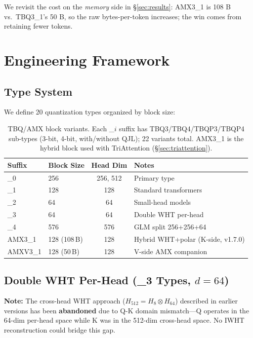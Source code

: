 \documentclass[10pt,twocolumn]{article}
\begin{document}
We revisit the cost on the \emph{memory} side in \S\ref{sec:results}: AMX3\_1 is 108 B vs.\ TBQ3\_1's 50 B, so the raw bytes-per-token increases; the win comes from retaining fewer tokens.

\section{Engineering Framework}
\label{sec:engineering}

\subsection{Type System}

We define 20 quantization types organized by block size:

\begin{table}[h]
\centering
\small
\begin{tabular}{@{}llcl@{}}
\toprule
Suffix & Block Size & Head Dim & Notes \\
\midrule
\_0 & 256 & 256, 512 & Primary type \\
\_1 & 128 & 128 & Standard transformers \\
\_2 & 64  & 64  & Small-head models \\
\_3 & 64  & 64  & Double WHT per-head \\
\_4 & 576 & 576 & GLM split 256+256+64 \\
\midrule
AMX3\_1  & 128 (108\,B) & 128 & Hybrid WHT+polar (K-side, v1.7.0) \\
AMXV3\_1 & 128 (50\,B)  & 128 & V-side AMX companion \\
\bottomrule
\end{tabular}
\caption{TBQ/AMX block variants. Each \_$i$ suffix has TBQ3/TBQ4/TBQP3/TBQP4 sub-types (3-bit, 4-bit, with/without QJL); 22 variants total. AMX3\_1 is the hybrid block used with TriAttention (\S\ref{sec:triattention}).}
\label{tab:types}
\end{table}

\subsection{Double WHT Per-Head (\_3 Types, $d=64$)}

\textbf{Note:} The cross-head WHT approach ($H_{512} = H_8 \otimes H_{64}$) described in earlier versions has been \textbf{abandoned} due to Q-K domain mismatch---Q operates in the 64-dim per-head space while K was in the 512-dim cross-head space. No IWHT reconstruction could bridge this gap.
\end{document}
